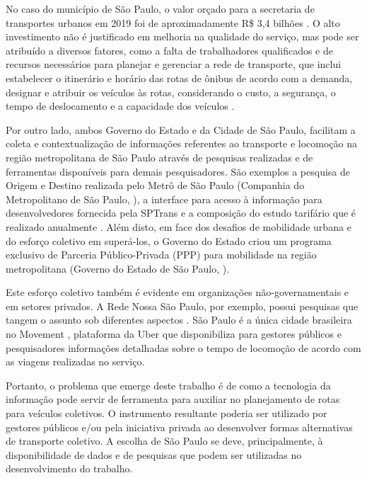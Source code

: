 No caso do município de São Paulo, o valor orçado para a secretaria de transportes urbanos em 2019 foi de aproximadamente R\$ 3,4 bilhões \cite{loatrans}. O alto investimento não é justificado em melhoria na qualidade do serviço, mas pode ser atribuído a diversos fatores, como a falta de trabalhadores qualificados e de recursos necessários para planejar e gerenciar a rede de transporte, que inclui estabelecer o itinerário e horário das rotas de ônibus de acordo com a demanda, designar e atribuir os veículos às rotas, considerando o custo, a segurança, o tempo de deslocamento e a capacidade dos veículos \cite{lima2016mixed}.

Por outro lado, ambos Governo do Estado e da Cidade de São Paulo, facilitam a coleta e contextualização de informações referentes ao transporte e locomoção na região metropolitana de São Paulo através de pesquisas realizadas e de ferramentas disponíveis para demais pesquisadores. São exemplos a pesquisa de Origem e Destino realizada pelo Metrô de São Paulo (Companhia do Metropolitano de São Paulo, \citeyear{odpq}), a interface para acesso à informação para desenvolvedores fornecida pela SPTrans \cite{sptranspq} e a composição do estudo tarifário que é realizado anualmente \cite{tarifapq}. Além disto, em face dos desafios de mobilidade urbana e do esforço coletivo em superá-los, o Governo do Estado criou um programa exclusivo de Parceria Público-Privada (PPP) para mobilidade na região metropolitana (Governo do Estado de São Paulo, \citeyear{ppppq}).

Este esforço coletivo também é evidente em organizações não-governamentais e em setores privados. A Rede Nossa São Paulo, por exemplo, possui pesquisas que tangem o assunto sob diferentes aspectos \cite{redepq}. São Paulo é a única cidade brasileira no Movement \cite{uberpq}, plataforma da Uber que disponibiliza para gestores públicos e pesquisadores informações detalhadas sobre o tempo de locomoção de acordo com as viagens realizadas no serviço.

Portanto, o problema que emerge deste trabalho é de como a tecnologia da informação pode servir de ferramenta para auxiliar no planejamento de rotas para veículos coletivos. O instrumento resultante poderia ser utilizado por gestores públicos e/ou pela iniciativa privada ao desenvolver formas alternativas de transporte coletivo. A escolha de São Paulo se deve, principalmente, à disponibilidade de dados e de pesquisas que podem ser utilizadas no desenvolvimento do trabalho.


